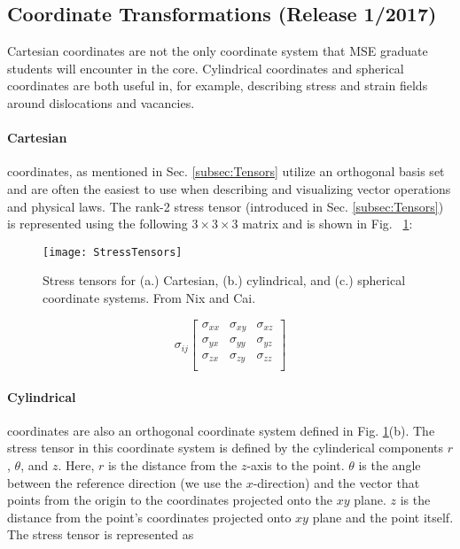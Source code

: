 \subsection{Coordinate Transformations \hfill(Release 1/2017)}

Cartesian coordinates are not the only coordinate system that MSE graduate students will encounter in the core. Cylindrical coordinates and spherical coordinates are both useful in, for example, describing stress and strain fields around dislocations and vacancies.

\paragraph{Cartesian} coordinates, as mentioned in Sec. \ref{subsec:Tensors} utilize an orthogonal basis set and are often the easiest to use when describing and visualizing vector operations and physical laws. The rank-2 stress tensor (introduced in Sec. \ref{subsec:Tensors}) is represented using the following $3 \times 3 \times 3$ matrix and is shown in Fig.~ \ref{fig:StressTensors}:

\begin{figure}%
	\texttt{[image: StressTensors]}%
	\caption{Stress tensors for (a.) Cartesian, (b.) cylindrical, and (c.) spherical coordinate systems. From Nix and Cai.}%
	\label{fig:StressTensors}%
\end{figure}

\begin{equation}
	\sigma_{ij}
	\begin{bmatrix}
		\sigma_{xx} & \sigma_{xy} & \sigma_{xz}\\
    \sigma_{yx} & \sigma_{yy} & \sigma_{yz}\\
    \sigma_{zx} & \sigma_{zy} & \sigma_{zz}\\
	\end{bmatrix}
	\label{eq:CartesianStressTensor}
\end{equation}

\paragraph{Cylindrical} coordinates are also an orthogonal coordinate system defined in Fig. \ref{fig:StressTensors}(b). The stress tensor in this coordinate system is defined by the cylinderical components $r$, $\theta$, and $z$. Here, $r$ is the distance from the $z$-axis to the point. $\theta$ is the angle between the reference direction (we use the $x$-direction) and the vector that points from the origin to the coordinates projected onto the $xy$ plane. $z$ is the distance from the point's coordinates projected onto $xy$ plane and the point itself. The stress tensor is represented as  

